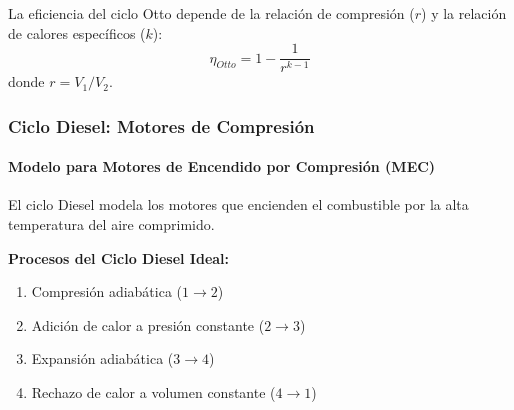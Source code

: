 \documentclass{beamer}
\begin{document}
\begin{frame}
    \vspace{0.5cm}
    La eficiencia del ciclo Otto depende de la relación de compresión ($r$) y la relación de calores específicos ($k$):
    $$ \eta_{Otto} = 1 - \frac{1}{r^{k-1}} $$
    donde $r = V_1 / V_2$.
\end{frame}

\begin{frame}
    \frametitle{Ciclo Diesel: Motores de Compresión}
    \framesubtitle{Modelo para Motores de Encendido por Compresión (MEC)}
    
    El ciclo Diesel modela los motores que encienden el combustible por la alta temperatura del aire comprimido.
    
    \textbf{Procesos del Ciclo Diesel Ideal:}
    \begin{enumerate}
        \item Compresión adiabática ($1 \rightarrow 2$)
        \item \alert{Adición de calor a presión constante} ($2 \rightarrow 3$)
        \item Expansión adiabática ($3 \rightarrow 4$)
        \item Rechazo de calor a volumen constante ($4 \rightarrow 1$)
    \end{enumerate}
    

\end{frame}
\end{document}
